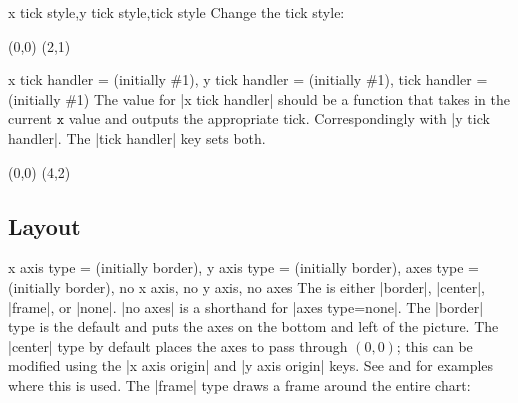 \begin{sseqdata}[name = basic, cohomological Serre grading]
\begin{stylekeylist}{x tick style,y tick style,tick style}
Change the tick style:
\begin{codeexample}[width = 7cm]
\begin{sseqpage}[ tick style = { blue, font = \tiny } ]
\class(0,0) \class(2,1)
\end{sseqpage}
\end{codeexample}
\end{stylekeylist}

\begin{keylist}{%
    x tick handler =  (initially \#1),%
    y tick handler =  (initially \#1),%
    tick handler =  (initially \#1)%
}
The value for |x tick handler| should be a function that takes in the current
$\mathtt{x}$ value and outputs the appropriate tick. Correspondingly with%
|y tick handler|. The |tick handler| key sets both.
\begin{codeexample}[width = 7cm]
\begin{sseqpage}[ x range = {0}{4}, yscale = 1.78,
    x tick handler = {
        \ifnum#1 = 0\relax
            0
        \else
            \ifnum#1 = 1\relax
                \protect\vphantom{2}n
            \else
                #1n
            \fi
        \fi
    }
]
\class(0,0)
\class(4,2)
\end{sseqpage}
\end{codeexample}
\end{keylist}

\subsection{Layout}
\begin{keylist}{%
    x axis type =  (initially border),%
    y axis type =  (initially border),%
    axes type =  (initially border),%
    no x axis,%
    no y axis,%
    no axes%
}%
The  is either |border|, |center|, |frame|, or |none|. |no axes| is a
shorthand for |axes type=none|. The |border| type is the default and puts the
axes on the bottom and left of the picture. The |center| type by default places
the axes to pass through $(0,0)$; this can be modified using the |x axis origin|
and |y axis origin| keys. See  and  for
examples where this is used. The |frame| type draws a frame around the entire
chart:


\end{keylist}
\end{sseqdata}
